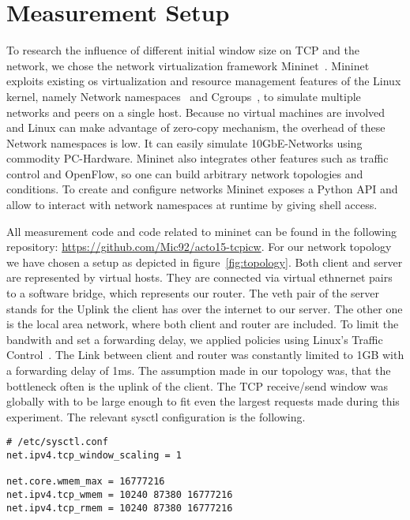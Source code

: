 \section{Measurement Setup}
\label{sec:measurement_setup}

To research the influence of different initial window size on TCP and the
network, we chose the network virtualization framework Mininet~\cite{mininet}.
Mininet exploits existing os virtualization and resource management features of
the Linux kernel, namely Network namespaces~\cite{network_namespaces} and
Cgroups~\cite{cgroups}, to simulate multiple networks and peers on a single
host. Because no virtual machines are involved and Linux can make advantage of
zero-copy mechanism, the overhead of these Network namespaces is low. It can
easily simulate 10GbE-Networks using commodity PC-Hardware. Mininet also
integrates other features such as traffic control and OpenFlow, so one can build
arbitrary network topologies and conditions. To create and configure networks
Mininet exposes a Python API and allow to interact with network namespaces at
runtime by giving shell access.



All measurement code and code related to mininet can be found in the following
repository: \url{https://github.com/Mic92/acto15-tcpicw}. For our network
topology we have chosen a setup as depicted in figure~\ref{fig:topology}. Both
client and server are represented by virtual hosts. They are connected via
virtual ethnernet pairs to a software bridge, which represents our router. The
veth pair of the server stands for the Uplink the client has over the internet
to our server. The other one is the local area network, where both client and
router are included. To limit the bandwith and set a forwarding delay, we
applied policies using Linux's Traffic Control~\cite{tc}. The Link between
client and router was constantly limited to 1GB with a forwarding delay of 1ms.
The assumption made in our topology was, that the bottleneck often is the uplink
of the client. The TCP receive/send window was globally with to be large enough
to fit even the largest requests made during this experiment. The relevant
sysctl configuration is the following.

\begin{lstlisting}
# /etc/sysctl.conf
net.ipv4.tcp_window_scaling = 1

net.core.wmem_max = 16777216
net.ipv4.tcp_wmem = 10240 87380 16777216
net.ipv4.tcp_rmem = 10240 87380 16777216
\end{lstlisting}

